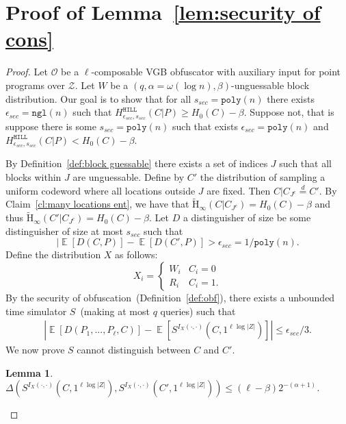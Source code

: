 \documentclass[11pt]{article}
\newcommand{\defref}[1]{\mbox{Definition~\ref{#1}}}
\newcommand{\lemref}[1]{\mbox{Lemma~\ref{#1}}}
\newcommand{\clref}[1]{\mbox{Claim~\ref{#1}}}
\DeclareMathOperator*{\expe}{\mathbb{E}}
\newcommand{\hill}{\ensuremath{\mathtt{HILL}}\xspace}
\newcommand{\poly}{\ensuremath{\mathtt{poly}}\xspace}
\newcommand{\ngl}{\ensuremath{\mathtt{ngl}}\xspace}
\newcommand{\Hav}{\tilde{\mathrm{H}}_\infty}
\newtheorem{lemma}[theorem]{Lemma}
\begin{document}
\section{Proof of \lemref{lem:security of cons}}
\label{app:security of main cons}
\begin{proof}

Let $\mathcal{O}$ be a $\ell$-composable VGB obfuscator with auxiliary input for point programs over $\mathcal{Z}$.  Let $W$ be a $(q, \alpha = \omega(\log n), \beta)$-unguessable block distribution.  Our goal is to show that for all $s_{sec} = \poly(n)$ there exists $\epsilon_{sec} =\ngl(n)$ such that $H^{\hill}_{\epsilon_{sec}, s_{sec}}(C|P)\geq H_0(C)- \beta$. %
Suppose not, that is suppose there is some $s_{sec} = \poly(n)$ such that exists $\epsilon_{sec} = \poly(n)$ and $H^{\hill}_{\epsilon_{sec}, s_{sec}}(C|P) < H_0(C)-\beta$.

By \defref{def:block guessable} there exists a set of indices $J$ such that all blocks within $J$ are unguessable.  Define by $C'$ the distribution of sampling a uniform codeword where all locations outside $J$ are fixed.  Then $C | C_{J^c} \overset{d}=C'$.  By \clref{cl:many locations ent}, we have that $\Hav(C|C_{J^c} )= H_0(C) -\beta$ and thus $\Hav(C'| C_{J^c}) = H_0(C) -\beta$.
Let $D$ a distinguisher of size be some distinguisher of size at most $s_{sec}$ such that
\[
| \expe[D(C, P)] - \expe[D(C', P)] > \epsilon_{sec} = 1/\poly(n).
\]
Define the distribution $X$ as follows:
\[X_i =
\begin{cases}
W_i & C_i = 0\\
R_i & C_i = 1.
\end{cases}\]  By the security of obfuscation~(\defref{def:obf}), there exists a unbounded time simulator $S$~(making at most $q$ queries) such that
\begin{align}
\label{eq:dist before}
|\expe [D(P_1,..., P_\ell, C)] - \expe [S^{I_X(\cdot, \cdot)}(C, 1^{\ell \log |Z|})] |\leq \epsilon_{sec}/3.
\end{align}
We now prove $S$ cannot distinguish between $C$ and $C'$.
\begin{lemma}
\label{lem:sim cannot distinguish}
$\Delta(S^{I_X(\cdot, \cdot)}(C, 1^{\ell \log |Z|}), S^{I_X(\cdot, \cdot)}(C', 1^{\ell \log |Z|})) \le (\ell-\beta) 2^{-(\alpha+1)}$.
\end{lemma}


\end{proof}
\end{document}
